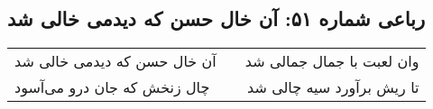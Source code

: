 \begin{center}
\section*{رباعی شماره ۵۱: آن خال حسن که دیدمی خالی شد}
\label{sec:051}
\begin{longtable}{l p{0.5cm} r}
آن خال حسن که دیدمی خالی شد
&&
وان لعبت با جمال جمالی شد
\\
چال زنخش که جان درو می‌آسود
&&
تا ریش برآورد سیه چالی شد
\\
\end{longtable}
\end{center}
